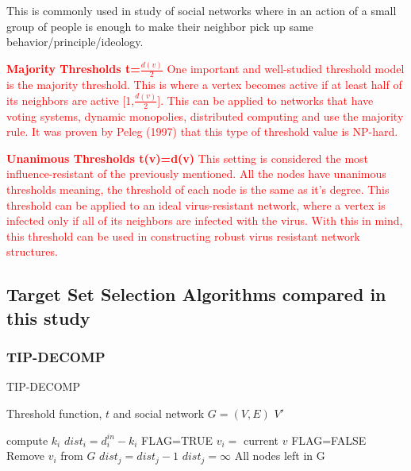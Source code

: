 \begin{enumerate}
This is commonly used in study of social networks where in an action of a small group of people is enough to make their neighbor pick up same behavior/principle/ideology.
	\textcolor{red}{
	\item \textbf{Majority Thresholds t=$\frac{d(v)}{2}$} One important and well-studied threshold model is the majority threshold. This is where a vertex becomes active if at least half of its neighbors are active [1,$\frac{d(v)}{2}$].\cite{chen} This can be applied to networks that have voting systems, dynamic monopolies, distributed computing and use the majority rule. It was proven by Peleg (1997) that this type of threshold value is NP-hard. \cite{majority} }
	
	\textcolor{red}{
	\item \textbf{Unanimous Thresholds t(v)=d(v)} This setting is considered the most influence-resistant of the previously mentioned.\cite{chen} All the nodes have unanimous thresholds meaning, the threshold of each node is the same as it's degree. This threshold can be applied to an ideal virus-resistant network, where a vertex is infected only if all of its neighbors are infected with the virus. With this in mind, this threshold can be used in constructing robust virus resistant network structures.\cite{chen} }
\end{enumerate}

\subsection{Target Set Selection Algorithms compared in this study}

\subsubsection{TIP-DECOMP}
\begin{algorithm}
	\caption{TIP-DECOMP}
	\begin{algorithmic}[1]
		\Require Threshold function, $t$ and social network $G=(V,E)$
		\Ensure $V'$
		
			\State compute $k_{i}$ 
		\EndFor
			\State $dist_{i}=d_{i}^{in}-k_{i} $
		\EndFor
		\State FLAG=TRUE 
					\State $v_{i}=$ current $v$
				\EndIf
			\EndFor
				\State FLAG=FALSE 
			\Else
			\State Remove $v_{i}$ from $G$ 
						\State $dist_{j}=dist_{j}-1$
					\Else
						\State$dist_{j}=\infty$  
					\EndIf
				\EndFor
			\EndIf
		\EndWhile
		\State \Return All nodes left in G 
	\end{algorithmic}
\end{algorithm}

